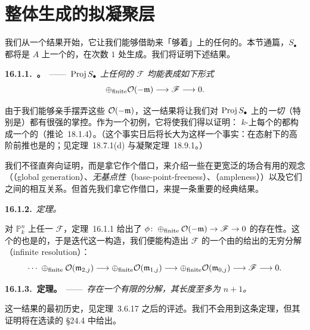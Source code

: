 
\section{整体生成的拟凝聚层}

我们从一个结果开始，它让我们能够借助\trLineBundle{}来「够着」\trProjectiveScheme{}上的任何\trFiniteType{}的\trQCSheaf。本节通篇，$S_\bullet$ 都将是 $A$ 上一个\trFinitelyGenerated{}的\trGradedRing，在次数 $1$ 处生成。我们将证明下述结果。

\textbf{16.1.1.\ \trhTheorem{}。}\ ——\ \emph{$\operatorname{Proj} S_\bullet$ 上任何\trFiniteType{}的\trQCSheaf{} $\mathscr{F}$ 均能表成如下形式}
\[
\oplus_{\mathrm{finite}}\mathcal{O}(-\mathfrak{m})\longrightarrow\mathscr{F}\longrightarrow 0.
\]

由于我们能够亲手摆弄这些\trLineBundle{} $\mathcal{O}(-\mathfrak{m})$，这一结果将让我们对 $\operatorname{Proj} S_\bullet$ 上的\emph{一切}\trCoherentSheaf（特别是\trVectorBundle）都有很强的掌控。作为一个初例，它将使我们得以证明：\trProjective{} $k$-\trScheme{}上每个\trCoherentSheaf{}的\trGlobalSections{}都构成一个\trFiniteDimensional{}的\trVectorSpace（\mbox{推论~18.1.4}）。（这个事实日后将长大为这样一个事实：\trCoherentSheaf{}在\trProper{}态射下的高阶前推也是\trCoh{}的；见\mbox{定理~18.7.1}(d) 与\trGrothendieck{}凝聚定理~18.9.1。）

我们不径直奔向证明，而是拿它作个借口，来介绍一些在更宽泛的场合有用的观念（\emph{\trGlobalGeneration}（global generation）、\emph{无基点性}（base-point-freeness）、\emph{\trAmpleness}（ampleness））以及它们之间的相互关系。但首先我们拿它作借口，来提一条重要的经典结果。

\textbf{16.1.2.}\ \emph{\trHilbert{}\trSyzygy{}定理。}

对 $\mathbb{P}^n_k$ 上任一\trCoherentSheaf{} $\mathscr{F}$，\mbox{定理~16.1.1} 给出了\trSurjectiveMap{} $\phi\colon\oplus_{\mathrm{finite}}\mathcal{O}(-\mathfrak{m})\to\mathscr{F}\to 0$ 的存在性。这个\trSurjectiveMap{}的\trKernel{}也是\trCoh{}的，于是迭代这一构造，我们便能构造出 $\mathscr{F}$ 的一个由\trLineBundle{}的\trDirectSum{}给出的无穷分解（infinite resolution）：
\[
\cdots\;\oplus_{\mathrm{finite}}\mathcal{O}(\mathfrak{m}_{2,j})\longrightarrow\oplus_{\mathrm{finite}}\mathcal{O}(\mathfrak{m}_{1,j})\longrightarrow\oplus_{\mathrm{finite}}\mathcal{O}(\mathfrak{m}_{0,j})\longrightarrow\mathscr{F}\longrightarrow 0.
\]

\textbf{16.1.3.\ \trHilbert{}\trSyzygy{}定理。}\ ——\ \emph{存在一个有限的分解，其长度至多为 $n+1$。}

这一结果的最初历史，见\mbox{定理~3.6.17} 之后的评述。我们不会用到这条定理，但其证明将在选读的 \S24.4 中给出。

